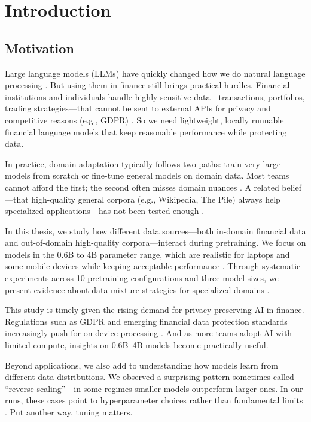 \chapter{Introduction}

\section{Motivation}

Large language models (LLMs) have quickly changed how we do natural language processing \parencite{vaswani2017attention,radford2019language,brown2020language,touvron2023llama}. But using them in finance still brings practical hurdles. Financial institutions and individuals handle highly sensitive data—transactions, portfolios, trading strategies—that cannot be sent to external APIs for privacy and competitive reasons (e.g., GDPR) \parencite{eu2016gdpr}. So we need lightweight, locally runnable financial language models that keep reasonable performance while protecting data.

In practice, domain adaptation typically follows two paths: train very large models from scratch or fine-tune general models on domain data. Most teams cannot afford the first; the second often misses domain nuances \parencite{gururangan2020don}. A related belief—that high-quality general corpora (e.g., Wikipedia, The Pile) always help specialized applications—has not been tested enough \parencite{gao2020pile,raffel2020exploring,longpre2023pretrainer}.

In this thesis, we study how different data sources—both in-domain financial data and out-of-domain high-quality corpora—interact during pretraining. We focus on models in the 0.6B to 4B parameter range, which are realistic for laptops and some mobile devices while keeping acceptable performance \parencite{yang2024qwen2,xia2023sheared,team2024gemma,javaheripi2023phi}. Through systematic experiments across 10 pretraining configurations and three model sizes, we present evidence about data mixture strategies for specialized domains \parencite{wu2023bloomberggpt}.

This study is timely given the rising demand for privacy-preserving AI in finance. Regulations such as GDPR and emerging financial data protection standards increasingly push for on-device processing \parencite{eu2016gdpr}. And as more teams adopt AI with limited compute, insights on 0.6B–4B models become practically useful.

Beyond applications, we also add to understanding how models learn from different data distributions. We observed a surprising pattern sometimes called ``reverse scaling''—in some regimes smaller models outperform larger ones. In our runs, these cases point to hyperparameter choices rather than fundamental limits \parencite{kaplan2020scaling,hoffmann2022training,mccandlish2018empirical}. Put another way, tuning matters.


